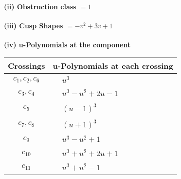 \documentclass[1p]{elsarticle_modified}
\theoremstyle{definition}
\begin{document}
\flushleft \textbf{(ii) Obstruction class $= 1$}\\~\\
\flushleft \textbf{(iii) Cusp Shapes $= - v^2+3 v+1$}\\~\\
\newpage\renewcommand{\arraystretch}{1}
\flushleft \textbf{(iv) u-Polynomials at the component}\newline \\
\begin{tabular}{m{50pt}|m{274pt}}
Crossings & \hspace{64pt}u-Polynomials at each crossing \\
\hline $$\begin{aligned}c_{1},c_{2},c_{6}\end{aligned}$$&$\begin{aligned}
&u^3
\end{aligned}$\\
\hline $$\begin{aligned}c_{3},c_{4}\end{aligned}$$&$\begin{aligned}
&u^3- u^2+2 u-1
\end{aligned}$\\
\hline $$\begin{aligned}c_{5}\end{aligned}$$&$\begin{aligned}
&(u-1)^3
\end{aligned}$\\
\hline $$\begin{aligned}c_{7},c_{8}\end{aligned}$$&$\begin{aligned}
&(u+1)^3
\end{aligned}$\\
\hline $$\begin{aligned}c_{9}\end{aligned}$$&$\begin{aligned}
&u^3- u^2+1
\end{aligned}$\\
\hline $$\begin{aligned}c_{10}\end{aligned}$$&$\begin{aligned}
&u^3+u^2+2 u+1
\end{aligned}$\\
\hline $$\begin{aligned}c_{11}\end{aligned}$$&$\begin{aligned}
&u^3+u^2-1
\end{aligned}$\\
\hline
\end{tabular}\\~\\
\end{document}
